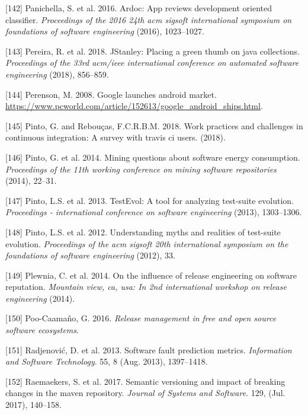 \documentclass[]{book}
\begin{document}
\hypertarget{ref-panichella2016ardoc}{}
{[}142{]} Panichella, S. et al. 2016. Ardoc: App reviews development
oriented classifier. \emph{Proceedings of the 2016 24th acm sigsoft
international symposium on foundations of software engineering} (2016),
1023--1027.

\hypertarget{ref-PSCS2018}{}
{[}143{]} Pereira, R. et al. 2018. JStanley: Placing a green thumb on
java collections. \emph{Proceedings of the 33rd acm/ieee international
conference on automated software engineering} (2018), 856--859.

\hypertarget{ref-androidMarketLaunch}{}
{[}144{]} Perenson, M. 2008. Google launches android market.
\url{https://www.pcworld.com/article/152613/google_android_ships.html}.

\hypertarget{ref-pinto2018work}{}
{[}145{]} Pinto, G. and Rebouças, F.C.R.B.M. 2018. Work practices and
challenges in continuous integration: A survey with travis ci users.
(2018).

\hypertarget{ref-PCL2014}{}
{[}146{]} Pinto, G. et al. 2014. Mining questions about software energy
consumption. \emph{Proceedings of the 11th working conference on mining
software repositories} (2014), 22--31.

\hypertarget{ref-pinto2013}{}
{[}147{]} Pinto, L.S. et al. 2013. TestEvol: A tool for analyzing
test-suite evolution. \emph{Proceedings - international conference on
software engineering} (2013), 1303--1306.

\hypertarget{ref-pinto2012understanding}{}
{[}148{]} Pinto, L.S. et al. 2012. Understanding myths and realities of
test-suite evolution. \emph{Proceedings of the acm sigsoft 20th
international symposium on the foundations of software engineering}
(2012), 33.

\hypertarget{ref-plewnia2014a}{}
{[}149{]} Plewnia, C. et al. 2014. On the influence of release
engineering on software reputation. \emph{Mountain view, ca, usa: In 2nd
international workshop on release engineering} (2014).

\hypertarget{ref-poo-caamano2016a}{}
{[}150{]} Poo-Caamaño, G. 2016. \emph{Release management in free and
open source software ecosystems}.

\hypertarget{ref-Radjenovic2013}{}
{[}151{]} Radjenović, D. et al. 2013. Software fault prediction metrics.
\emph{Information and Software Technology}. 55, 8 (Aug. 2013),
1397--1418.

\hypertarget{ref-Raemaekers2017}{}
{[}152{]} Raemaekers, S. et al. 2017. Semantic versioning and impact of
breaking changes in the maven repository. \emph{Journal of Systems and
Software}. 129, (Jul. 2017), 140--158.
\end{document}
